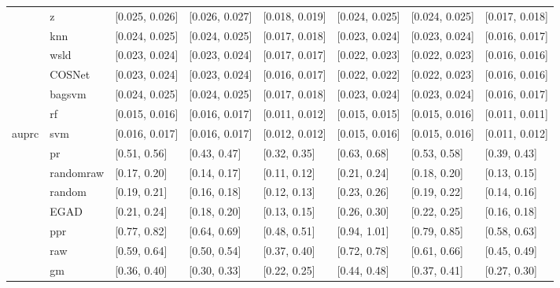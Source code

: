 \begin{table}[H]
{\begin{tabular}{llllllll}
 & z & [0.025, 0.026] & [0.026, 0.027] & [0.018, 0.019] & [0.024, 0.025] & [0.024, 0.025] & [0.017, 0.018]\\

 & knn & [0.024, 0.025] & [0.024, 0.025] & [0.017, 0.018] & [0.023, 0.024] & [0.023, 0.024] & [0.016, 0.017]\\

 & wsld & [0.023, 0.024] & [0.023, 0.024] & [0.017, 0.017] & [0.022, 0.023] & [0.022, 0.023] & [0.016, 0.016]\\

 & COSNet & [0.023, 0.024] & [0.023, 0.024] & [0.016, 0.017] & [0.022, 0.022] & [0.022, 0.023] & [0.016, 0.016]\\

 & bagsvm & [0.024, 0.025] & [0.024, 0.025] & [0.017, 0.018] & [0.023, 0.024] & [0.023, 0.024] & [0.016, 0.017]\\

 & rf & [0.015, 0.016] & [0.016, 0.017] & [0.011, 0.012] & [0.015, 0.015] & [0.015, 0.016] & [0.011, 0.011]\\

\multirow{-15}{*}{\raggedright\arraybackslash auprc} & svm & [0.016, 0.017] & [0.016, 0.017] & [0.012, 0.012] & [0.015, 0.016] & [0.015, 0.016] & [0.011, 0.012]\\
\cmidrule{1-8}
 & pr & [0.51, 0.56] & [0.43, 0.47] & [0.32, 0.35] & [0.63, 0.68] & [0.53, 0.58] & [0.39, 0.43]\\

 & randomraw & [0.17, 0.20] & [0.14, 0.17] & [0.11, 0.12] & [0.21, 0.24] & [0.18, 0.20] & [0.13, 0.15]\\

 & random & [0.19, 0.21] & [0.16, 0.18] & [0.12, 0.13] & [0.23, 0.26] & [0.19, 0.22] & [0.14, 0.16]\\

 & EGAD & [0.21, 0.24] & [0.18, 0.20] & [0.13, 0.15] & [0.26, 0.30] & [0.22, 0.25] & [0.16, 0.18]\\

 & ppr & [0.77, 0.82] & [0.64, 0.69] & [0.48, 0.51] & [0.94, 1.01] & [0.79, 0.85] & [0.58, 0.63]\\

 & raw & [0.59, 0.64] & [0.50, 0.54] & [0.37, 0.40] & [0.72, 0.78] & [0.61, 0.66] & [0.45, 0.49]\\

 & gm & [0.36, 0.40] & [0.30, 0.33] & [0.22, 0.25] & [0.44, 0.48] & [0.37, 0.41] & [0.27, 0.30]\\


\end{tabular}}
\end{table}
